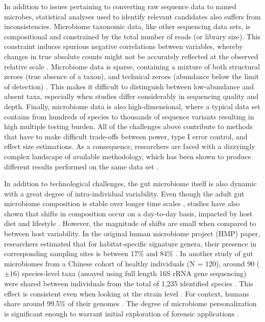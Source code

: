 In addition to issues pertaining to converting raw sequence data to named microbes, statistical analyses used to identify relevant candidates also suffers from inconsistencies. Microbiome taxonomic data, like other sequencing data sets, is compositional \cite{gloor2017microbiome, quinn2019field} and constrained by the total number of reads (or library size). This constraint induces spurious negative correlations between variables, whereby changes in true absolute counts might not be accurately reflected at the observed relative scale \cite{lin2020analysis, morton2019establishing}. Microbiome data is sparse, containing a mixture of both structural zeroes (true absence of a taxon), and technical zeroes (abundance below the limit of detection) \cite{kaul2017analysis, silverman2020naught}. This makes it difficult to distinguish between low-abundance and absent taxa, especially when studies differ considerably in sequencing quality and depth. Finally, microbiome data is also high-dimensional, where a typical data set contains from hundreds of species to thousands of sequence variants resulting in high multiple testing burden. All of the challenges above contribute to methods that have to make difficult trade-offs between power, type I error control, and effect size estimations. As a consequence, researchers are faced with a dizzyingly complex landscape of available methodology, which has been shown to produce different results performed on the same data set \cite{nearing2022microbiome}.   

In addition to technological challenges, the gut microbiome itself is also dynamic with a great degree of intra-individual variability. Even though the adult gut microbiome composition is stable over longer time scales \cite{consortium2012structure}, studies have also shown that shifts in composition occur on a day-to-day basis, impacted by host diet and lifestyle \cite{david2014host, david2014diet}. However, the magnitude of shifts are small when compared to between host variability. In the original human microbiome project (HMP) paper, researchers estimated that for habitat-specific signature genera, their presence in corresponding sampling sites is between 17\% and 84\% \cite{consortium2012structure}. In another study of gut microbiomes from a Chinese cohort of healthy individuals (N = 120), around 90 ($\pm 16$) species-level taxa (assayed using full length 16S rRNA gene sequencing) were shared between individuals from the total of 1,235 identified species \cite{yang2020species}. This effect is consistent even when looking at the strain level \cite{lloyd-price2017strains}. For context, humans share around 99.5\% of their genomes \cite{genetics}. The degree of microbiome personalization is significant enough to warrant initial exploration of forensic applications \cite{fierer2010forensic}. 


